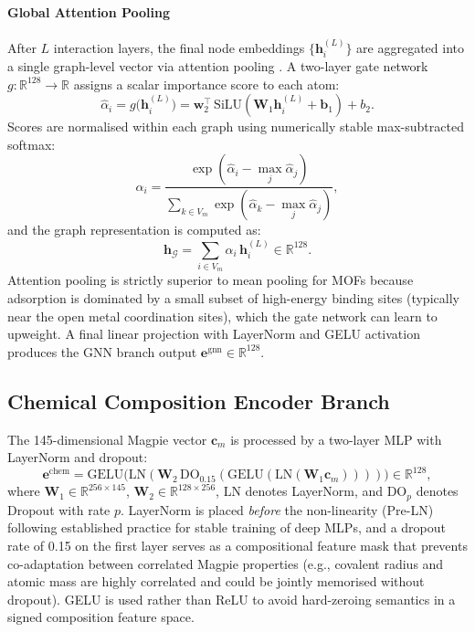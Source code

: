 \documentclass[conference]{IEEEtran}
\begin{document}
\paragraph{Global Attention Pooling}
After $L$ interaction layers, the final node embeddings
$\{\mathbf{h}_i^{(L)}\}$ are aggregated into a single graph-level vector
via attention pooling \cite{fung2021}.  A two-layer gate network
$g: \mathbb{R}^{128}\to\mathbb{R}$ assigns a scalar importance score to
each atom:
\begin{equation}
  \hat{\alpha}_i = g\bigl(\mathbf{h}_i^{(L)}\bigr)
                 = \mathbf{w}_2^\top\,\mathrm{SiLU}(
                     \mathbf{W}_1\mathbf{h}_i^{(L)}+\mathbf{b}_1)+b_2.
  \label{eq:gate}
\end{equation}
Scores are normalised within each graph using numerically stable
max-subtracted softmax:
\begin{equation}
  \alpha_i = \frac{\exp(\hat{\alpha}_i - \max_j\hat{\alpha}_j)}
                  {\sum_{k\in V_m}\exp(\hat{\alpha}_k - \max_j\hat{\alpha}_j)},
  \label{eq:attn_pool}
\end{equation}
and the graph representation is computed as:
\begin{equation}
  \mathbf{h}_{\mathcal{G}}
    = \sum_{i\in V_m}\alpha_i\,\mathbf{h}_i^{(L)}
    \in\mathbb{R}^{128}.
  \label{eq:pool}
\end{equation}
Attention pooling is strictly superior to mean pooling for MOFs because
adsorption is dominated by a small subset of high-energy binding sites
(typically near the open metal coordination sites), which the gate network
can learn to upweight.  A final linear projection with LayerNorm and GELU
activation produces the GNN branch output
$\mathbf{e}^{\text{gnn}}\in\mathbb{R}^{128}$.

\subsection{Chemical Composition Encoder Branch}
\label{sec:arch_chem}

The 145-dimensional Magpie vector $\mathbf{c}_m$ is processed by a
two-layer MLP with LayerNorm and dropout:
\begin{equation}
  \mathbf{e}^{\text{chem}}
  = \mathrm{GELU}\!\bigl(\mathrm{LN}(
      \mathbf{W}_2\,
      \mathrm{DO}_{0.15}(
        \mathrm{GELU}(
          \mathrm{LN}(\mathbf{W}_1\mathbf{c}_m)
        )
      )
    )\bigr)
  \in\mathbb{R}^{128},
  \label{eq:chem_enc}
\end{equation}
where $\mathbf{W}_1\in\mathbb{R}^{256\times145}$,
$\mathbf{W}_2\in\mathbb{R}^{128\times256}$,
LN denotes LayerNorm, and DO$_p$ denotes Dropout with rate $p$.
LayerNorm is placed \emph{before} the non-linearity (Pre-LN) following
established practice for stable training of deep MLPs, and a dropout rate
of 0.15 on the first layer serves as a compositional feature mask that
prevents co-adaptation between correlated Magpie properties (e.g.,
covalent radius and atomic mass are highly correlated and could be
jointly memorised without dropout).  GELU is used rather than ReLU to
avoid hard-zeroing semantics in a signed composition feature space.
\end{document}
